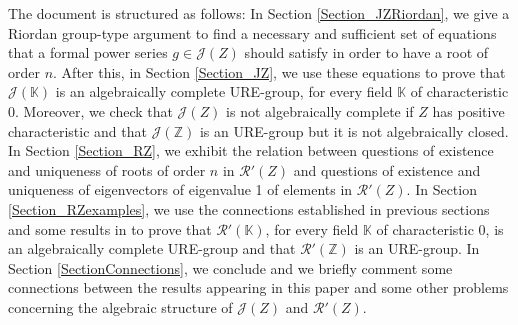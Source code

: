 \documentclass[preprint,12pt]{elsarticle}
\begin{document}


The document is structured as follows: In Section \ref{Section_JZRiordan}, we give a Riordan group-type argument to find a necessary and sufficient set of equations that a formal power series $g\in \mathcal J(Z)$ should satisfy in order to have a root of order $n$. After this, in Section \ref{Section_JZ}, we use these equations to prove that $\mathcal J(\mathbb K)$ is an algebraically complete URE-group, for every field $\mathbb K$ of characteristic 0. Moreover, we check that $\mathcal J(Z)$ is not algebraically complete if $Z$ has positive characteristic and that $\mathcal J(\mathbb Z)$ is an URE-group but it is not algebraically closed. In Section \ref{Section_RZ}, we exhibit the relation between questions of existence and uniqueness of roots of order $n$ in $\mathcal R'(Z)$  and questions of existence and uniqueness of eigenvectors of eigenvalue 1 of elements in $\mathcal R'(Z)$. In Section \ref{Section_RZexamples}, we use the connections established in previous sections and some results in \cite{LMP} to prove that $\mathcal R'(\mathbb K)$, for every field $\mathbb K$ of characteristic $0$, is an algebraically complete URE-group and that $\mathcal R'(\mathbb Z)$ is an URE-group. In Section \ref{SectionConnections}, we conclude and we briefly comment some connections between the results appearing in this paper and some other problems concerning the algebraic structure of $\mathcal J(Z)$ and $\mathcal R'(Z)$.





\end{document}
